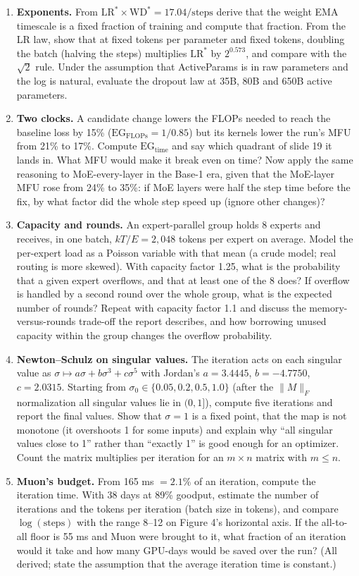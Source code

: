 \documentclass[11pt,letterpaper]{article}
\begin{document}
\begin{enumerate}[leftmargin=1.6em,itemsep=6pt]
\item \textbf{Exponents.} From $\text{LR}^*\times\text{WD}^*=17.04/\text{steps}$ derive that the weight EMA timescale is a fixed fraction of training and compute that fraction. From the LR law, show that at fixed tokens per parameter and fixed tokens, doubling the batch (halving the steps) multiplies $\text{LR}^*$ by $2^{0.573}$, and compare with the $\sqrt2$ rule. Under the assumption that ActiveParams is in raw parameters and the log is natural, evaluate the dropout law at 35B, 80B and 650B active parameters.
\item \textbf{Two clocks.} A candidate change lowers the FLOPs needed to reach the baseline loss by 15\% ($\text{EG}_{\text{FLOPs}}=1/0.85$) but its kernels lower the run's MFU from 21\% to 17\%. Compute $\text{EG}_{\text{time}}$ and say which quadrant of slide 19 it lands in. What MFU would make it break even on time? Now apply the same reasoning to MoE-every-layer in the Base-1 era, given that the MoE-layer MFU rose from 24\% to 35\%: if MoE layers were half the step time before the fix, by what factor did the whole step speed up (ignore other changes)?
\item \textbf{Capacity and rounds.} An expert-parallel group holds 8 experts and receives, in one batch, $kT/E=2{,}048$ tokens per expert on average. Model the per-expert load as a Poisson variable with that mean (a crude model; real routing is more skewed). With capacity factor 1.25, what is the probability that a given expert overflows, and that at least one of the 8 does? If overflow is handled by a second round over the whole group, what is the expected number of rounds? Repeat with capacity factor 1.1 and discuss the memory-versus-rounds trade-off the report describes, and how borrowing unused capacity within the group changes the overflow probability.
\item \textbf{Newton--Schulz on singular values.} The iteration acts on each singular value as $\sigma\mapsto a\sigma+b\sigma^{3}+c\sigma^{5}$ with Jordan's $a=3.4445$, $b=-4.7750$, $c=2.0315$. Starting from $\sigma_0\in\{0.05,0.2,0.5,1.0\}$ (after the $\|M\|_F$ normalization all singular values lie in $(0,1]$), compute five iterations and report the final values. Show that $\sigma=1$ is a fixed point, that the map is not monotone (it overshoots 1 for some inputs) and explain why ``all singular values close to 1'' rather than ``exactly 1'' is good enough for an optimizer. Count the matrix multiplies per iteration for an $m\times n$ matrix with $m\le n$.
\item \textbf{Muon's budget.} From 165 ms $=2.1\%$ of an iteration, compute the iteration time. With 38 days at 89\% goodput, estimate the number of iterations and the tokens per iteration (batch size in tokens), and compare $\log(\text{steps})$ with the range 8--12 on Figure 4's horizontal axis. If the all-to-all floor is 55 ms and Muon were brought to it, what fraction of an iteration would it take and how many GPU-days would be saved over the run? (All derived; state the assumption that the average iteration time is constant.)

\end{enumerate}
\end{document}
